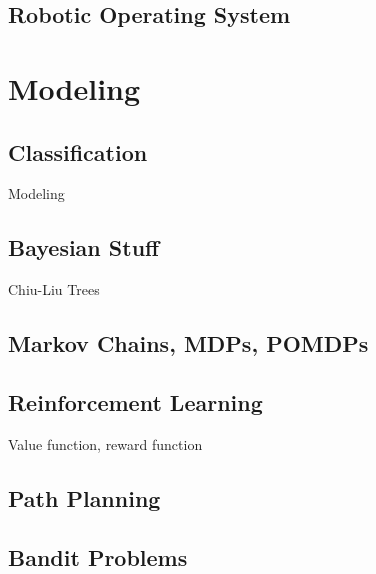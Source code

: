 \subsection{Robotic Operating System}

\section{Modeling}

\subsection{Classification}
Modeling 

\subsection{Bayesian Stuff}
Chiu-Liu Trees

\subsection{Markov Chains, MDPs, POMDPs}

\subsection{Reinforcement Learning}
Value function, reward function

\subsection{Path Planning}

\subsection{Bandit Problems}

